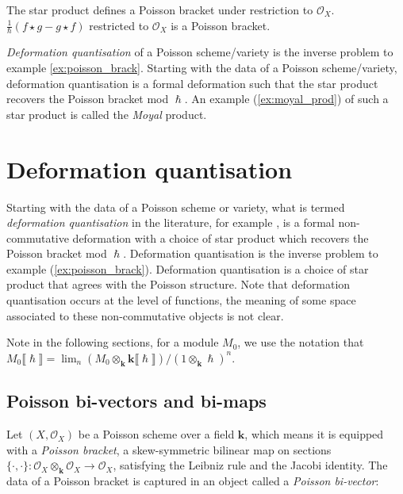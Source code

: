     
    \begin{ex}
    \label{ex:poisson_brack}
    The star product defines a Poisson bracket under restriction to \( \mathcal{O}_X\).
    \( \frac{1}{\hslash} \left( f \star g - g \star f\right) \) restricted to \( \mathcal{O}_X\) is a Poisson bracket.
    \end{ex} 

    
    
    \emph{Deformation quantisation} of a Poisson scheme/variety is the inverse problem to example \ref{ex:poisson_brack}. Starting with the data of a Poisson scheme/variety, deformation quantisation is a formal deformation such that the star product recovers the Poisson bracket mod \( \hslash\). An example  (\ref{ex:moyal_prod}) of such a star product is called the \emph{Moyal} product.
    
    
    \section{Deformation quantisation}
   
    
    Starting with the data of a Poisson scheme or variety, what is termed \emph{deformation quantisation} in the literature, for example \cite{yekutieli}, is a formal non-commutative deformation with a choice of star product which recovers the Poisson bracket mod \( \hslash\).  Deformation quantisation is the inverse problem to example (\ref{ex:poisson_brack}). Deformation quantisation is a choice of star product that agrees with the Poisson structure. Note that deformation quantisation occurs at the level of functions, the meaning of some space associated to these non-commutative objects is not clear.
    
    Note in the following sections, for a module \(M_0\), we use the notation that
    \( M_0 \lBrack \hslash \rBrack = \lim_n (M_0 \otimes_{\mathbf{k}} \mathbf{k} \lBrack \hslash \rBrack)  / ( 1 \otimes_{\mathbf{k}} \hslash)^n\).
    

    
    \subsection{Poisson bi-vectors and bi-maps}
    
    Let \( (X,\mathcal{O}_X)\) be a Poisson scheme over a field \( \mathbf{k}\), which means it is equipped with a \emph{Poisson bracket}, a skew-symmetric bilinear map on sections \( \{ \cdot ,\cdot \} : \mathcal{O}_X \otimes_{\mathbf{k}} \mathcal{O}_X \rightarrow \mathcal{O}_X \), satisfying the Leibniz rule and the Jacobi identity. The data of a Poisson bracket is captured in an object called a \emph{Poisson bi-vector}:

